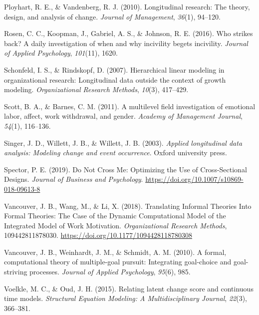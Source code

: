 \documentclass[english,,man]{apa6}
\begin{document}
\leavevmode\hypertarget{ref-ployhart_longitudinal_2010}{}%
Ployhart, R. E., \& Vandenberg, R. J. (2010). Longitudinal research: The theory, design, and analysis of change. \emph{Journal of Management}, \emph{36}(1), 94--120.

\leavevmode\hypertarget{ref-rosen_who_2016}{}%
Rosen, C. C., Koopman, J., Gabriel, A. S., \& Johnson, R. E. (2016). Who strikes back? A daily investigation of when and why incivility begets incivility. \emph{Journal of Applied Psychology}, \emph{101}(11), 1620.

\leavevmode\hypertarget{ref-schonfeld2007hierarchical}{}%
Schonfeld, I. S., \& Rindskopf, D. (2007). Hierarchical linear modeling in organizational research: Longitudinal data outside the context of growth modeling. \emph{Organizational Research Methods}, \emph{10}(3), 417--429.

\leavevmode\hypertarget{ref-scott_multilevel_2011}{}%
Scott, B. A., \& Barnes, C. M. (2011). A multilevel field investigation of emotional labor, affect, work withdrawal, and gender. \emph{Academy of Management Journal}, \emph{54}(1), 116--136.

\leavevmode\hypertarget{ref-singer_applied_2003}{}%
Singer, J. D., Willett, J. B., \& Willett, J. B. (2003). \emph{Applied longitudinal data analysis: Modeling change and event occurrence}. Oxford university press.

\leavevmode\hypertarget{ref-spector_not_2019}{}%
Spector, P. E. (2019). Do Not Cross Me: Optimizing the Use of Cross-Sectional Designs. \emph{Journal of Business and Psychology}. \url{https://doi.org/10.1007/s10869-018-09613-8}

\leavevmode\hypertarget{ref-vancouver_translating_2018}{}%
Vancouver, J. B., Wang, M., \& Li, X. (2018). Translating Informal Theories Into Formal Theories: The Case of the Dynamic Computational Model of the Integrated Model of Work Motivation. \emph{Organizational Research Methods}, 109442811878030. \url{https://doi.org/10.1177/1094428118780308}

\leavevmode\hypertarget{ref-vancouver2010formal}{}%
Vancouver, J. B., Weinhardt, J. M., \& Schmidt, A. M. (2010). A formal, computational theory of multiple-goal pursuit: Integrating goal-choice and goal-striving processes. \emph{Journal of Applied Psychology}, \emph{95}(6), 985.

\leavevmode\hypertarget{ref-voelkle2015relating}{}%
Voelkle, M. C., \& Oud, J. H. (2015). Relating latent change score and continuous time models. \emph{Structural Equation Modeling: A Multidisciplinary Journal}, \emph{22}(3), 366--381.
\end{document}
